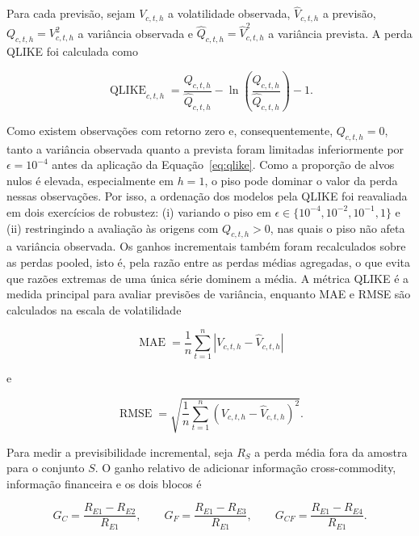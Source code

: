 \documentclass[a4paper,fleqn]{cas-sc}
\begin{document}
Para cada previsão, sejam \(V_{c,t,h}\) a volatilidade observada, \(\widehat{V}_{c,t,h}\) a previsão, \(Q_{c,t,h}=V_{c,t,h}^{2}\) a variância observada e \(\widehat{Q}_{c,t,h}=\widehat{V}_{c,t,h}^{2}\) a variância prevista. A perda QLIKE foi calculada como

\begin{equation}
\operatorname{QLIKE}_{c,t,h}
=
\frac{Q_{c,t,h}}{\widehat{Q}_{c,t,h}}
-\ln\left(\frac{Q_{c,t,h}}{\widehat{Q}_{c,t,h}}\right)-1.
\label{eq:qlike}
\end{equation}

Como existem observações com retorno zero e, consequentemente, \(Q_{c,t,h}=0\), tanto a variância observada quanto a prevista foram limitadas inferiormente por \(\epsilon=10^{-4}\) antes da aplicação da Equação~\ref{eq:qlike}. Como a proporção de alvos nulos é elevada, especialmente em \(h=1\), o piso pode dominar o valor da perda nessas observações. Por isso, a ordenação dos modelos pela QLIKE foi reavaliada em dois exercícios de robustez: (i) variando o piso em \(\epsilon\in\{10^{-4},10^{-2},10^{-1},1\}\) e (ii) restringindo a avaliação às origens com \(Q_{c,t,h}>0\), nas quais o piso não afeta a variância observada. Os ganhos incrementais também foram recalculados sobre as perdas pooled, isto é, pela razão entre as perdas médias agregadas, o que evita que razões extremas de uma única série dominem a média. A métrica QLIKE é a medida principal para avaliar previsões de variância, enquanto MAE e RMSE são calculados na escala de volatilidade

\begin{equation}
\operatorname{MAE}
=
\frac{1}{n}\sum_{t=1}^{n}
\left\lvert V_{c,t,h}-\widehat{V}_{c,t,h}\right\rvert
\label{eq:mae}
\end{equation}

e

\begin{equation}
\operatorname{RMSE}
=
\sqrt{
\frac{1}{n}\sum_{t=1}^{n}
\left(V_{c,t,h}-\widehat{V}_{c,t,h}\right)^{2}
}.
\label{eq:rmse}
\end{equation}

Para medir a previsibilidade incremental, seja \(R_S\) a perda média fora da amostra para o conjunto \(S\). O ganho relativo de adicionar informação cross-commodity, informação financeira e os dois blocos é

\begin{equation}
G_C=\frac{R_{E1}-R_{E2}}{R_{E1}},
\qquad
G_F=\frac{R_{E1}-R_{E3}}{R_{E1}},
\qquad
G_{CF}=\frac{R_{E1}-R_{E4}}{R_{E1}}.
\label{eq:incremental_gain}
\end{equation}
\end{document}
